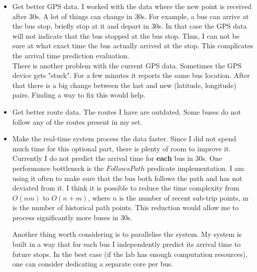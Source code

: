 \documentclass[12pt,a4paper,oneside,openright]{report}
\begin{document}
\begin{itemize}

\item  Get better GPS data. I worked with the data where the new point is received after
       30s. A lot of things can change in 30s. For example, a bus can arrive at the bus
       stop, briefly stop at it and depart in 30s. In that case the GPS data will not
       indicate that the bus stopped at the bus stop. Thus, I can not be sure at what exact
       time the bus actually arrived at the stop. This complicates the arrival time
       prediction evaluation. \\

       There is another problem with the current GPS data. Sometimes the GPS device gets
       "stuck". For a few minutes it reports the same bus location. After that there is
       a big change between the last and new (latitude, longitude) pairs. Finding a way
       to fix this would help.

\item  Get better route data. The routes I have are outdated. Some buses do not follow any
       of the routes present in my set.

\item  Make the real-time system process the data faster. Since I did not spend much time
       for this optional part, there is plenty of room to improve it. Currently I do not
       predict the arrival time for \textbf{each} bus in 30s. One performance bottleneck is
       the $FollowsPath$ predicate implementation. I am using it often to make sure that
       the bus both follows the path and has not deviated from it. I think it is possible
       to reduce the time complexity from $O(nm)$ to $O(n + m)$, where $n$ is the number of
       recent sub-trip points, m is the number of historical path points. This reduction
       would allow me to process significantly more buses in 30s.

       Another thing worth considering is to parallelise the system. My system is built in
       a way that for each bus I independently predict its arrival time to future stops.
       In the best case (if the lab has enough computation resources), one can consider
       dedicating a separate core per bus.

\end{itemize}

\appendix
\end{document}

